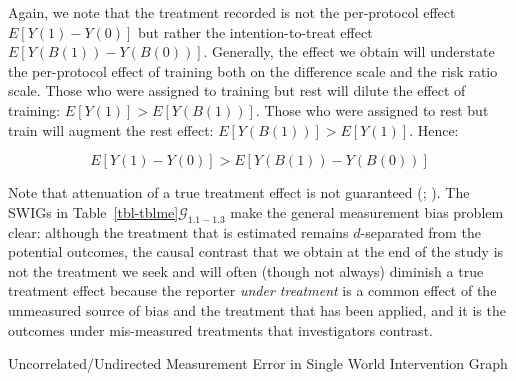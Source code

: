 \documentclass[
  single column]{article}
\begin{document}
Again, we note that the treatment recorded is not the per-protocol
effect \(E[Y(1) - Y(0)]\) but rather the intention-to-treat effect
\(E[Y(B(1)) - Y(B(0))]\). Generally, the effect we obtain will
understate the per-protocol effect of training both on the difference
scale and the risk ratio scale. Those who were assigned to training but
rest will dilute the effect of training: \(E[Y(1)] > E[Y(B(1))]\). Those
who were assigned to rest but train will augment the rest effect:
\(E[Y(B(1))] > E[Y(1)]\). Hence:

\[
 E[Y(1) - Y(0)] > E[Y(B(1)) - Y(B(0))]
\]

Note that attenuation of a true treatment effect is not guaranteed
(;
). The SWIGs in
Table~\ref{tbl-tblme}\(\mathcal{G}_{1.1-1.3}\) make the general
measurement bias problem clear: although the treatment that is estimated
remains \(d\)-separated from the potential outcomes, the causal contrast
that we obtain at the end of the study is not the treatment we seek and
will often (though not always) diminish a true treatment effect because
the reporter \emph{under treatment} is a common effect of the unmeasured
source of bias and the treatment that has been applied, and it is the
outcomes under mis-measured treatments that investigators contrast.

\begin{table}

\caption{\label{tbl-tblme}Uncorrelated/Undirected Measurement Error in
Single World Intervention Graph}

\centering{

\tblme

}

\end{table}%
\end{document}
